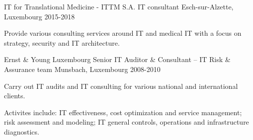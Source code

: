 \begin{cventries}
  \cventry
    {IT for Translational Medicine - ITTM S.A.}
    {IT consultant}
    {Esch-sur-Alzette, Luxembourg}
    {2015-2018}
    {
      \begin{cvitems}
        \item {Provide various consulting services around IT and medical IT with a focus on strategy, security and IT architecture.}
      \end{cvitems}    
    }

  \cventry
    {Ernst \& Young Luxembourg} %
    {Senior IT Auditor \& Consultant -- IT Risk \& Assurance team} %
    {Munsbach, Luxembourg} %
    {2008-2010} %
    {
      \begin{cvitems} %
        \item {Carry out IT audits and IT consulting for various national and international clients.}
        \item {Activites include: IT effectiveness, cost optimization and service management; risk assessment and modeling; IT general controls, operations and infrastructure diagnostics.}
      \end{cvitems}
    }
\end{cventries}

